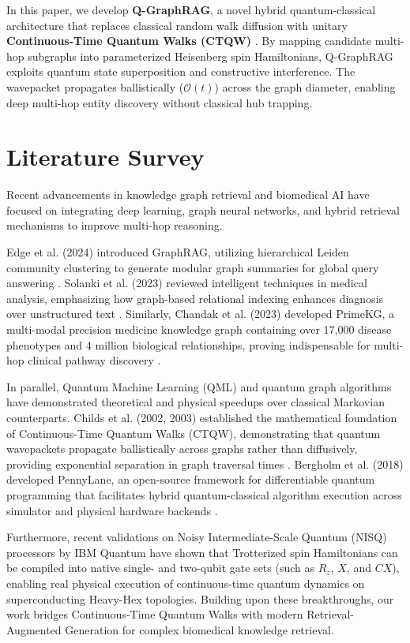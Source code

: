 \documentclass[runningheads]{llncs}
\begin{document}
In this paper, we develop \textbf{Q-GraphRAG}, a novel hybrid quantum-classical architecture that replaces classical random walk diffusion with unitary \textbf{Continuous-Time Quantum Walks (CTQW)} \cite{childs2002continuous, childs2003exponential}. By mapping candidate multi-hop subgraphs into parameterized Heisenberg spin Hamiltonians, Q-GraphRAG exploits quantum state superposition and constructive interference. The wavepacket propagates ballistically ($\mathcal{O}(t)$) across the graph diameter, enabling deep multi-hop entity discovery without classical hub trapping.

\section{Literature Survey}
Recent advancements in knowledge graph retrieval and biomedical AI have focused on integrating deep learning, graph neural networks, and hybrid retrieval mechanisms to improve multi-hop reasoning.

Edge et al. (2024) introduced GraphRAG, utilizing hierarchical Leiden community clustering to generate modular graph summaries for global query answering \cite{edge2024graphrag}. Solanki et al. (2023) reviewed intelligent techniques in medical analysis, emphasizing how graph-based relational indexing enhances diagnosis over unstructured text \cite{solanki2023}. Similarly, Chandak et al. (2023) developed PrimeKG, a multi-modal precision medicine knowledge graph containing over 17,000 disease phenotypes and 4 million biological relationships, proving indispensable for multi-hop clinical pathway discovery \cite{chandak2023building}.

In parallel, Quantum Machine Learning (QML) and quantum graph algorithms have demonstrated theoretical and physical speedups over classical Markovian counterparts. Childs et al. (2002, 2003) established the mathematical foundation of Continuous-Time Quantum Walks (CTQW), demonstrating that quantum wavepackets propagate ballistically across graphs rather than diffusively, providing exponential separation in graph traversal times \cite{childs2002continuous, childs2003exponential}. Bergholm et al. (2018) developed PennyLane, an open-source framework for differentiable quantum programming that facilitates hybrid quantum-classical algorithm execution across simulator and physical hardware backends \cite{bergholm2018pennylane}.

Furthermore, recent validations on Noisy Intermediate-Scale Quantum (NISQ) processors by IBM Quantum have shown that Trotterized spin Hamiltonians can be compiled into native single- and two-qubit gate sets (such as $R_z$, $X$, and $CX$), enabling real physical execution of continuous-time quantum dynamics on superconducting Heavy-Hex topologies. Building upon these breakthroughs, our work bridges Continuous-Time Quantum Walks with modern Retrieval-Augmented Generation for complex biomedical knowledge retrieval.
\end{document}
